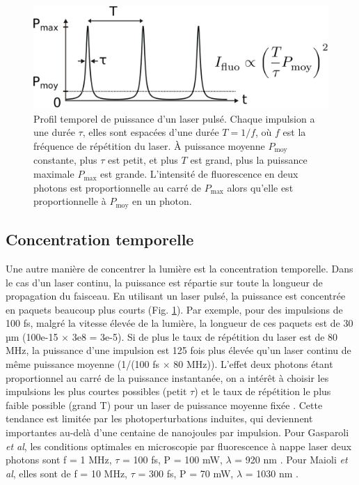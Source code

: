 \begin{figure}[p]
    \centering
    \includegraphics[width=\textwidth]{./files/pulsed_laser.svg.png}
    \caption{Profil temporel de puissance d'un laser pulsé. Chaque impulsion a une durée $\tau$, elles sont espacées d'une durée $T=1/f$, où $f$ est la fréquence de répétition du laser. À puissance moyenne $P_\text{moy}$ constante, plus $\tau$ est petit, et plus $T$ est grand, plus la puissance maximale $P_\text{max}$ est grande. L'intensité de fluorescence en deux photons est proportionnelle au carré de $P_\text{max}$ alors qu'elle est proportionnelle à $P_\text{moy}$ en un photon.
    }
    \label{FIGpulsed-laser}
    \end{figure}

\subsection{Concentration temporelle}\label{SECTIONconcentrationtemporelle}
    
Une autre manière de concentrer la lumière est la concentration temporelle. Dans le cas d'un laser continu, la puissance est répartie sur toute la longueur de propagation du faisceau. En utilisant un laser pulsé, la puissance est concentrée en paquets beaucoup plus courts (Fig. \ref{FIGpulsed-laser}). Par exemple, pour des impulsions de 100 fs, malgré la vitesse élevée de la lumière, la longueur de ces paquets est de 30 µm (100e-15 $\times$ 3e8 = 3e-5). Si de plus le taux de répétition du laser est de 80 MHz, la puissance d'une impulsion est 125 fois plus élevée qu'un laser continu de même puissance moyenne (1/(100 fs $\times$ 80 MHz)). L'effet deux photons étant proportionnel au carré de la puissance instantanée, on a intérêt à choisir les impulsions les plus courtes possibles (petit $\tau$) et le taux de répétition le plus faible possible (grand T) pour un laser de puissance moyenne fixée \cite{maioli_fast_2020}. Cette tendance est limitée par les photoperturbations induites, qui deviennent importantes au-delà d'une centaine de nanojoules par impulsion. Pour Gasparoli \emph{et al}, les conditions optimales en microscopie par fluorescence à nappe laser deux photons sont f = 1 MHz, $\tau$ = 100 fs, P = 100 mW, $\lambda$ = 920 nm \cite{gasparoli_is_2020}. Pour Maioli \emph{et al}, elles sont de f = 10 MHz, $\tau$ = 300 fs, P = 70 mW, $\lambda$ = 1030 nm \cite{maioli_fast_2020}.

